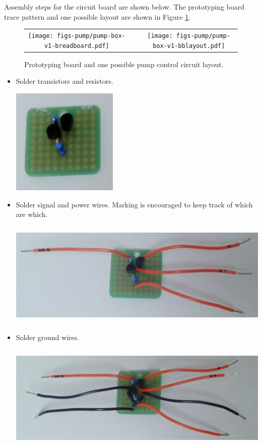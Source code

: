 Assembly steps for the circuit board are shown below. The prototyping board
trace pattern and one possible layout are shown in Figure
\ref{fig-pumpbox-protoboard}.

\begin{figure}
\begin{center}
\begin{tabular}{ccc}
\texttt{[image: figs-pump/pump-box-v1-breadboard.pdf]}
& ~ &
\texttt{[image: figs-pump/pump-box-v1-bblayout.pdf]}
\\
\end{tabular}
\end{center}
\caption{Prototyping board and one possible pump control circuit layout.}
\label{fig-pumpbox-protoboard}
\end{figure}

\begin{itemize}
%
\item Solder transistors and resistors.

\includegraphics[height=2in]
{photos/pump-box-20181112/board-comps.jpg}

\item Solder signal and power wires. Marking is encouraged to keep track
of which are which.

\includegraphics[height=2in]
{photos/pump-box-20181112/board-orange.jpg}

\clearpage
\item Solder ground wires.

\includegraphics[height=2in]
{photos/pump-box-20181112/board-black.jpg}


\end{itemize}
